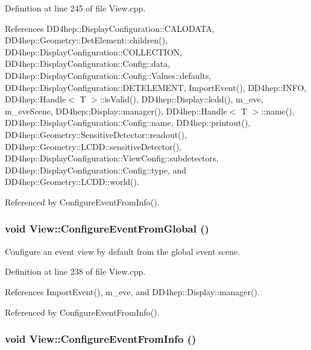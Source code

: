 Definition at line 245 of file View.cpp.

References DD4hep::DisplayConfiguration::CALODATA, DD4hep::Geometry::DetElement::children(), DD4hep::DisplayConfiguration::COLLECTION, DD4hep::DisplayConfiguration::Config::data, DD4hep::DisplayConfiguration::Config::Values::defaults, DD4hep::DisplayConfiguration::DETELEMENT, ImportEvent(), DD4hep::INFO, DD4hep::Handle$<$ T $>$::isValid(), DD4hep::Display::lcdd(), m\_\-eve, m\_\-eveScene, DD4hep::Display::manager(), DD4hep::Handle$<$ T $>$::name(), DD4hep::DisplayConfiguration::Config::name, DD4hep::printout(), DD4hep::Geometry::SensitiveDetector::readout(), DD4hep::Geometry::LCDD::sensitiveDetector(), DD4hep::DisplayConfiguration::ViewConfig::subdetectors, DD4hep::DisplayConfiguration::Config::type, and DD4hep::Geometry::LCDD::world().

Referenced by ConfigureEventFromInfo().\hypertarget{class_d_d4hep_1_1_view_a70d3dfc35cf31c58c5d6e1d1385d1b56}{
\subsubsection[{ConfigureEventFromGlobal}]{\setlength{\rightskip}{0pt plus 5cm}void View::ConfigureEventFromGlobal ()}}
\label{class_d_d4hep_1_1_view_a70d3dfc35cf31c58c5d6e1d1385d1b56}


Configure an event view by default from the global event scene. 

Definition at line 238 of file View.cpp.

References ImportEvent(), m\_\-eve, and DD4hep::Display::manager().

Referenced by ConfigureEventFromInfo().\hypertarget{class_d_d4hep_1_1_view_a1c4ddbce48cb4e389a8d515a4644773b}{
\subsubsection[{ConfigureEventFromInfo}]{\setlength{\rightskip}{0pt plus 5cm}void View::ConfigureEventFromInfo ()}}
\label{class_d_d4hep_1_1_view_a1c4ddbce48cb4e389a8d515a4644773b}


